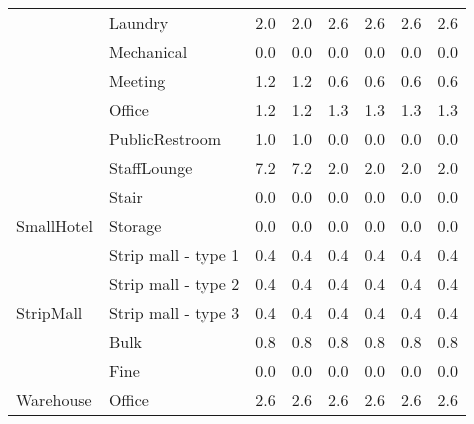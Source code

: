 \begin{center}
\begin{longtable}{p{1.25in}p{1in}p{0.5in}p{0.5in}p{0.5in}p{0.5in}p{0.5in}p{0.5in}}
                                   & Laundry                              & 2.0     & 2.0     & 2.6    & 2.6   & 2.6   & 2.6    \\
                                   & Mechanical                           & 0.0     & 0.0     & 0.0    & 0.0   & 0.0   & 0.0    \\
                                   & Meeting                              & 1.2     & 1.2     & 0.6    & 0.6   & 0.6   & 0.6    \\
                                   & Office                               & 1.2     & 1.2     & 1.3    & 1.3   & 1.3   & 1.3    \\
                                   & PublicRestroom                       & 1.0     & 1.0     & 0.0    & 0.0   & 0.0   & 0.0    \\
                                   & StaffLounge                          & 7.2     & 7.2     & 2.0    & 2.0   & 2.0   & 2.0    \\
                                   & Stair                                & 0.0     & 0.0     & 0.0    & 0.0   & 0.0   & 0.0    \\
SmallHotel                         & Storage                              & 0.0     & 0.0     & 0.0    & 0.0   & 0.0   & 0.0    \\
                                   & Strip mall - type 1                  & 0.4     & 0.4     & 0.4    & 0.4   & 0.4   & 0.4    \\
                                   & Strip mall - type 2                  & 0.4     & 0.4     & 0.4    & 0.4   & 0.4   & 0.4    \\
StripMall                          & Strip mall - type 3                  & 0.4     & 0.4     & 0.4    & 0.4   & 0.4   & 0.4    \\
                                   & Bulk                                 & 0.8     & 0.8     & 0.8    & 0.8   & 0.8   & 0.8    \\
                                   & Fine                                 & 0.0     & 0.0     & 0.0    & 0.0   & 0.0   & 0.0    \\
Warehouse                          & Office                               & 2.6     & 2.6     & 2.6    & 2.6   & 2.6   & 2.6    \\
\end{longtable}
\end{center}